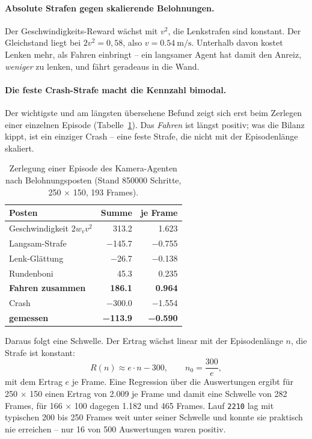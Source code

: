 \paragraph{Absolute Strafen gegen skalierende Belohnungen.}
Der Geschwindigkeits-Reward wächst mit $v^2$, die Lenkstrafen sind konstant. Der Gleichstand liegt bei $2v^2 = 0{,}58$, also $v = \SI{0.54}{\meter\per\second}$. Unterhalb davon kostet Lenken mehr, als Fahren einbringt -- ein langsamer Agent hat damit den Anreiz, \emph{weniger} zu lenken, und fährt geradeaus in die Wand.

\paragraph{Die feste Crash-Strafe macht die Kennzahl bimodal.}
Der wichtigste und am längsten übersehene Befund zeigt sich erst beim Zerlegen einer einzelnen Episode (Tabelle~\ref{tab:reward_zerlegung}). Das \emph{Fahren} ist längst positiv; was die Bilanz kippt, ist ein einziger Crash -- eine feste Strafe, die nicht mit der Episodenlänge skaliert.

\begin{table}[htbp]
  \centering
  \caption{Zerlegung einer Episode des Kamera-Agenten nach Belohnungsposten (Stand \num{850000} Schritte, \num{250} $\times$ \num{150}, \num{193} Frames).}
  \label{tab:reward_zerlegung}
  \begin{tabular}{@{}l r r@{}}
    \toprule
    \textbf{Posten} & \textbf{Summe} & \textbf{je Frame} \\
    \midrule
    Geschwindigkeit $2 w_v v^2$        & \num{+313.2} & \num{+1.623} \\
    Langsam-Strafe           & \num{-145.7} & \num{-0.755} \\
    Lenk-Glättung            & \num{-26.7}  & \num{-0.138} \\
    Rundenboni               & \num{+45.3}  & \num{+0.235} \\
    \midrule
    \textbf{Fahren zusammen} & \textbf{\num{+186.1}} & \textbf{\num{+0.964}} \\
    Crash                    & \num{-300.0} & \num{-1.554} \\
    \midrule
    \textbf{gemessen}        & \textbf{\num{-113.9}} & \textbf{\num{-0.590}} \\
    \bottomrule
  \end{tabular}
\end{table}

Daraus folgt eine Schwelle. Der Ertrag wächst linear mit der Episodenlänge $n$, die Strafe ist konstant:
\begin{equation}
  R(n) \approx e \cdot n - 300, \qquad n_0 = \frac{300}{e},
  \label{eq:schwelle_episodenlaenge}
\end{equation}
mit dem Ertrag $e$ je Frame. Eine Regression über die Auswertungen ergibt für \num{250} $\times$ \num{150} einen Ertrag von \num{2.009} je Frame und damit eine Schwelle von \num{282} Frames, für \num{166} $\times$ \num{100} dagegen \num{1.182} und \num{465} Frames. Lauf \texttt{2210} lag mit typischen \num{200} bis \num{250} Frames weit unter seiner Schwelle und konnte sie praktisch nie erreichen -- nur \num{16} von \num{500} Auswertungen waren positiv.

